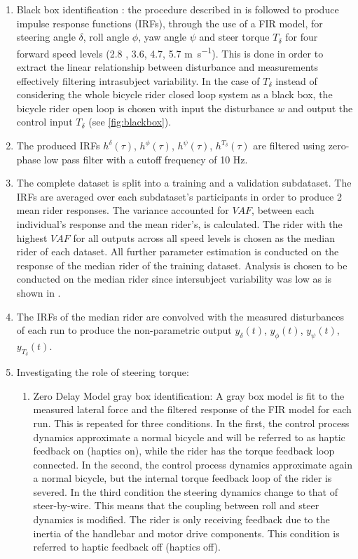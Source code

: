\begin{enumerate}
    \item Black box identification : the procedure described in \cite{dialynaseffect} is followed to produce impulse response functions (IRFs), through the use of a FIR model, for steering angle \ensuremath{\delta}, roll angle \ensuremath{\phi}, yaw angle \ensuremath{\psi} and steer torque  \ensuremath{T_\delta} for four forward speed levels (2.8 , 3.6, 4.7, 5.7 \si{m.s^{-1}}). This is done in order to extract the linear relationship between disturbance and measurements effectively filtering intrasubject variability. In the case of \ensuremath{T_\delta} instead of considering the whole bicycle rider closed loop system as a black box, the bicycle rider open loop is chosen with input the disturbance \ensuremath{w} and output the control input \ensuremath{T_\delta} (see \cref{fig:blackbox}).
    \item The produced IRFs \ensuremath{h^\delta(\tau)}, \ensuremath{h^\phi(\tau)}, \ensuremath{h^\psi(\tau)}, \ensuremath{h^{T_\delta}(\tau)} are filtered using zero-phase low pass filter with a cutoff frequency of 10 \si{\hertz}.
    \item The complete dataset is split into a training and a validation subdataset. The IRFs are averaged over each subdataset's participants in order to produce 2 mean rider responses. The variance accounted for \ensuremath{\mathit{VAF}}, between each individual's  response and the mean rider's, is calculated. The rider with the highest  \ensuremath{\mathit{VAF}} for all outputs  across all speed levels  is chosen as the median rider of each dataset. All further parameter estimation is conducted on the response of the median rider of the training dataset. Analysis is chosen to be conducted on the median rider since intersubject variability was low as is shown in \cite{dialynaseffect}.
    \item The IRFs of the median rider are convolved with the measured disturbances of each run to produce the non-parametric output \ensuremath{y_\delta(t)}, \ensuremath{y_\phi(t)}, \ensuremath{y_\psi(t)}, \ensuremath{y_{T_\delta}(t)}.
    \item Investigating the role of steering torque: {
        \begin{enumerate}
            \item Zero Delay Model gray box identification: A gray box model  is fit to the measured lateral force and the filtered response of the FIR
            model for each run. This is repeated for three conditions. In the first, the control process dynamics approximate a normal bicycle and will be referred to as haptic feedback on (haptics on), while  the rider has the torque feedback loop connected. In the second, the control process dynamics approximate again a normal bicycle, but the internal torque feedback loop of the rider is severed. In the third condition the steering dynamics change to that of steer-by-wire. This means that the coupling between roll and steer dynamics is modified. The rider is only receiving feedback due to the inertia of the handlebar and motor drive components. This condition is referred to haptic feedback off (haptics off).

\end{enumerate}}
\end{enumerate}
